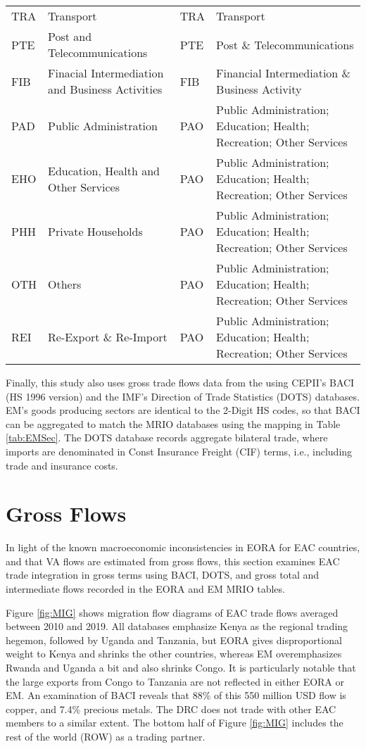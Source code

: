 \documentclass[a4paper]{article}
\begin{document}
\begin{table}[h!]
{\begin{tabular}{llll}
  TRA & Transport & TRA & Transport \\ 
  PTE & Post and Telecommunications & PTE & Post \& Telecommunications \\ 
  FIB & Finacial Intermediation and Business Activities & FIB & Financial Intermediation \& Business Activity \\ 
  PAD & Public Administration & PAO & Public Administration; Education; Health; Recreation; Other Services \\ 
  EHO & Education, Health and Other Services & PAO & Public Administration; Education; Health; Recreation; Other Services \\ 
  PHH & Private Households & PAO & Public Administration; Education; Health; Recreation; Other Services \\ 
  OTH & Others & PAO & Public Administration; Education; Health; Recreation; Other Services \\ 
  REI & Re-Export \& Re-Import & PAO & Public Administration; Education; Health; Recreation; Other Services \\ 
   \bottomrule
\end{tabular}
}
\end{table}
\FloatBarrier

Finally, this study also uses gross trade flows data from the using CEPII's BACI \citep{CEPIIBACI} (HS 1996 version) and the IMF's Direction of Trade Statistics (DOTS) \citep{IMFDOTS} databases. EM's goods producing sectors are identical to the 2-Digit HS codes, so  that BACI can be aggregated to match the MRIO databases using the mapping in Table \ref{tab:EMSec}. The DOTS database records aggregate bilateral trade, where imports are denominated in Const Insurance Freight (CIF) terms, i.e., including trade and insurance costs. 


\newpage


\section{Gross Flows}

In light of the known macroeconomic inconsistencies in EORA for EAC countries, and that VA flows are estimated from gross flows, this section examines EAC trade integration in gross terms using BACI, DOTS, and gross total and intermediate flows recorded in the EORA and EM MRIO tables. \newline

Figure \ref{fig:MIG} shows migration flow diagrams of EAC trade flows averaged between 2010 and 2019. All databases emphasize Kenya as the regional trading hegemon, followed by Uganda and Tanzania, but EORA gives disproportional weight to Kenya and shrinks the other countries, whereas EM overemphasizes Rwanda and Uganda a bit and also shrinks Congo. It is particularly notable that the large exports from Congo to Tanzania are not reflected in either EORA or EM. An examination of BACI reveals that 88\% of this 550 million USD flow is copper, and 7.4\% precious metals. The DRC does not trade with other EAC members to a similar extent. The bottom half of Figure \ref{fig:MIG} includes the rest of the world (ROW) as a trading partner. 
\end{document}
